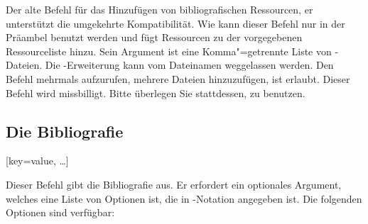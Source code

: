 \documentclass{ltxdockit}[2011/03/25]
\begin{document}
\begin{ltxsyntax}
\DeprecatedMark

Der alte Befehl für das Hinzufügen von bibliografischen Ressourcen, er unterstützt
die umgekehrte Kompatibilität. Wie  kann dieser Befehl
nur in der Präambel benutzt werden und fügt Ressourcen zu der vorgegebenen
Ressourceliste hinzu. Sein Argument ist eine Komma"=getrennte Liste von
-Dateien. Die -Erweiterung kann vom Dateinamen weggelassen
werden. Den Befehl mehrmals aufzurufen, mehrere Dateien hinzuzufügen, ist erlaubt.
Dieser Befehl wird missbilligt. Bitte überlegen Sie stattdessen, 
zu benutzen.  

\subsection{Die Bibliografie} \label{use:bib:bib}

[key=value, \dots]

Dieser Befehl gibt die Bibliografie aus. Er erfordert ein optionales Argument,
welches eine Liste von Optionen ist, die in \keyval-Notation angegeben ist. Die
folgenden Optionen sind verfügbar: 

\end{ltxsyntax}
\end{document}
